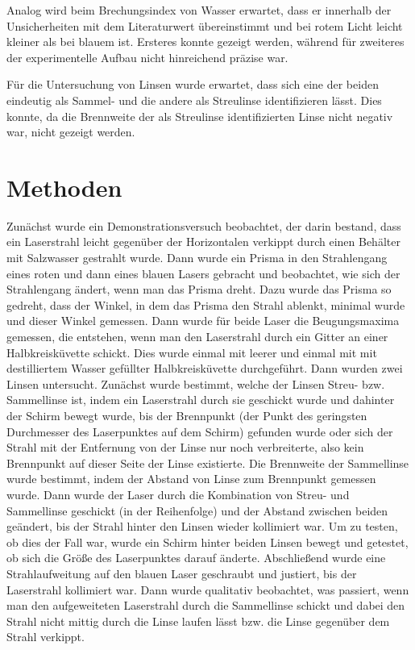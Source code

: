 \documentclass[
	a4paper,
	12pt,
	pagesize,
	ngerman
]{scrartcl}
\begin{document}
	Analog wird beim Brechungsindex von Wasser erwartet, dass er innerhalb der Unsicherheiten mit dem Literaturwert übereinstimmt und bei rotem Licht leicht kleiner als bei blauem ist.
	Ersteres konnte gezeigt werden, während für zweiteres der experimentelle Aufbau nicht hinreichend präzise war.
	
	Für die Untersuchung von Linsen wurde erwartet, dass sich eine der beiden eindeutig als Sammel- und die andere als Streulinse identifizieren lässt.
	Dies konnte, da die Brennweite der als Streulinse identifizierten Linse nicht negativ war, nicht gezeigt werden.
	\section{Methoden}
	Zunächst wurde ein Demonstrationsversuch beobachtet, der darin bestand, dass ein Laserstrahl leicht gegenüber der Horizontalen verkippt durch einen Behälter mit Salzwasser gestrahlt wurde.
	Dann wurde ein Prisma in den Strahlengang eines roten und dann eines blauen Lasers gebracht und beobachtet, wie sich der Strahlengang ändert, wenn man das Prisma dreht.
	Dazu wurde das Prisma so gedreht, dass der Winkel, in dem das Prisma den Strahl ablenkt, minimal wurde und dieser Winkel gemessen.
	Dann wurde für beide Laser die Beugungsmaxima gemessen, die entstehen, wenn man den Laserstrahl durch ein Gitter an einer Halbkreisküvette schickt.
	Dies wurde einmal mit leerer und einmal mit mit destilliertem Wasser gefüllter Halbkreisküvette durchgeführt.
	Dann wurden zwei Linsen untersucht.
	Zunächst wurde bestimmt, welche der Linsen Streu- bzw. Sammellinse ist, indem ein Laserstrahl durch sie geschickt wurde und dahinter der Schirm bewegt wurde, bis der Brennpunkt (der Punkt des geringsten Durchmesser des Laserpunktes auf dem Schirm) gefunden wurde oder sich der Strahl mit der Entfernung von der Linse nur noch verbreiterte, also kein Brennpunkt auf dieser Seite der Linse existierte.
	Die Brennweite der Sammellinse wurde bestimmt, indem der Abstand von Linse zum Brennpunkt gemessen wurde.
	Dann wurde der Laser durch die Kombination von Streu- und Sammellinse geschickt (in der Reihenfolge) und der Abstand zwischen beiden geändert, bis der Strahl hinter den Linsen wieder kollimiert war.
	Um zu testen, ob dies der Fall war, wurde ein Schirm hinter beiden Linsen bewegt und getestet, ob sich die Größe des Laserpunktes darauf änderte.
	Abschließend wurde eine Strahlaufweitung auf den blauen Laser geschraubt und justiert, bis der Laserstrahl kollimiert war.
	Dann wurde qualitativ beobachtet, was passiert, wenn man den aufgeweiteten Laserstrahl durch die Sammellinse schickt und dabei den Strahl nicht mittig durch die Linse laufen lässt bzw. die Linse gegenüber dem Strahl verkippt.
	
\end{document}
